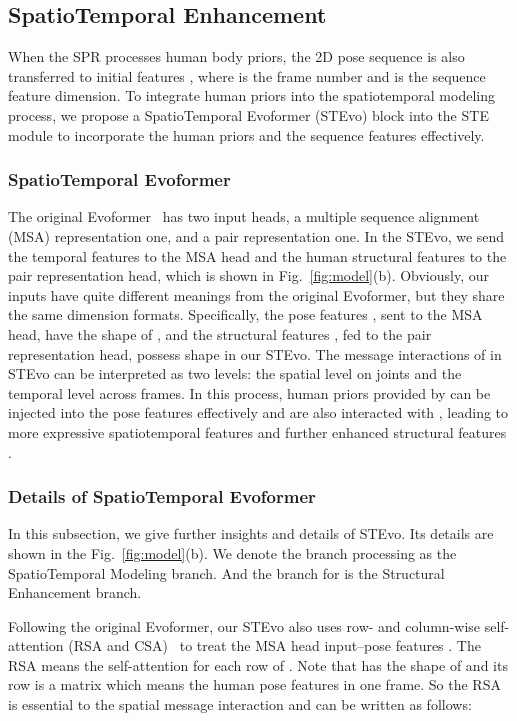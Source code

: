 \documentclass{article}
\begin{document}
\subsection{SpatioTemporal Enhancement}When the SPR processes human body priors, the 2D pose sequence is also transferred to initial features , where  is the frame number and  is the sequence feature dimension. 
To integrate human priors into the spatiotemporal modeling process, we propose a SpatioTemporal Evoformer (STEvo) block into the STE module to incorporate the human priors  and the sequence features  effectively.\vspace{-0.2em}
\subsubsection{SpatioTemporal Evoformer}
The original Evoformer~\cite{jumper2021highly} has two input heads, a multiple sequence alignment (MSA) representation one, and a pair representation one. In the STEvo, we send the temporal features  to the MSA head and the human structural features  to the pair representation head, which is shown in Fig.~\ref{fig:model}(b). Obviously, our inputs have quite different meanings from the original Evoformer, but they share the same dimension formats. Specifically, the pose features , sent to the MSA head, have the shape of , and the structural features , fed to the pair representation head, possess  shape in our STEvo. The message interactions of  in STEvo can be interpreted as two levels: the spatial level on  joints and the temporal level across  frames. In this process, human priors provided by  can be injected into the pose features  effectively and  are also interacted with , leading to more expressive spatiotemporal features  and further enhanced structural features .\vspace{-0.2em}


\subsubsection{Details of SpatioTemporal Evoformer}
In this subsection, we give further insights and details of STEvo. Its details are shown in the Fig.~\ref{fig:model}(b). We denote the branch processing  as the SpatioTemporal Modeling branch. And the branch for  is the Structural Enhancement branch. 

 Following the original Evoformer, our STEvo also uses row- and column-wise self-attention (RSA and CSA)~\cite{jumper2021highly} to treat the MSA head input--pose features . The RSA means the self-attention for each row of . Note that  has the shape of  and its row is a  matrix which means the human pose features in one frame. So the RSA is essential to the spatial message interaction and can be written as follows:
\setlength\abovedisplayskip{0.1em}
\setlength\belowdisplayskip{0.1em}
\end{document}
